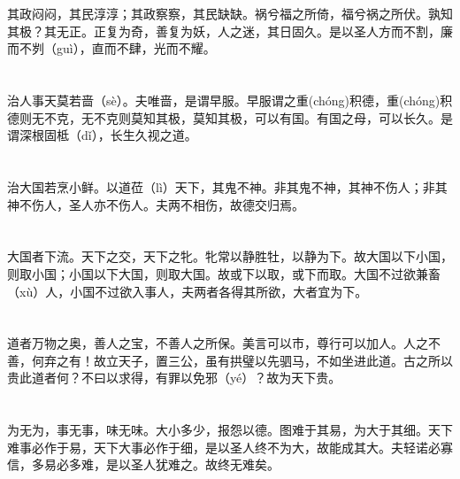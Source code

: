 \documentclass[a4paper,12pt,UTF8,twoside]{ctexbook}
\begin{document}
	其政闷闷，其民淳淳；其政察察，其民缺缺。祸兮福之所倚，福兮祸之所伏。孰知其极？其无正。正复为奇，善复为妖，人之迷，其日固久。是以圣人方而不割，廉而不刿（guì），直而不肆，光而不耀。
	
	\chapter{}	
	
	治人事天莫若啬（sè）。夫唯啬，是谓早服。早服谓之重(chóng)积德，重(chóng)积德则无不克，无不克则莫知其极，莫知其极，可以有国。有国之母，可以长久。是谓深根固柢（dǐ），长生久视之道。
	
	\chapter{}	
	
	治大国若烹小鲜。以道莅（lì）天下，其鬼不神。非其鬼不神，其神不伤人；非其神不伤人，圣人亦不伤人。夫两不相伤，故德交归焉。
	
	\chapter{}	
	
	大国者下流。天下之交，天下之牝。牝常以静胜牡，以静为下。故大国以下小国，则取小国；小国以下大国，则取大国。故或下以取，或下而取。大国不过欲兼畜（xù）人，小国不过欲入事人，夫两者各得其所欲，大者宜为下。
	
	\chapter{}	
	
	道者万物之奥，善人之宝，不善人之所保。美言可以市，尊行可以加人。人之不善，何弃之有！故立天子，置三公，虽有拱璧以先驷马，不如坐进此道。古之所以贵此道者何？不曰以求得，有罪以免邪（yé）？故为天下贵。
	
	\chapter{}	
	
	为无为，事无事，味无味。大小多少，报怨以德。图难于其易，为大于其细。天下难事必作于易，天下大事必作于细，是以圣人终不为大，故能成其大。夫轻诺必寡信，多易必多难，是以圣人犹难之。故终无难矣。
	
	\chapter{}	
	
\end{document}

